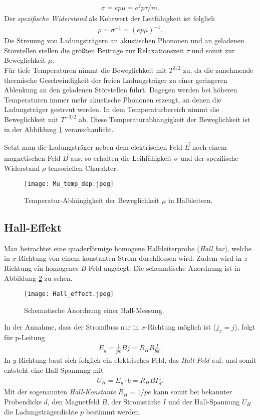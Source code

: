 \begin{align}
\sigma=ep\mu=e^2p\tau/m.
\end{align}
Der \emph{spezifische Widerstand} als Kehrwert der Leitfähigkeit ist folglich
\begin{align}
\rho=\sigma^{-1}=(ep\mu)^{-1}.
\label{eq:p_rho_mu}
\end{align}
Die Streuung von Ladungsträgern an akustischen Phononen und an geladenen Störstellen stellen die größten Beiträge zur Relaxationszeit $\tau$ und somit   zur Beweglichkeit $\mu$.\\
Für tiefe Temperaturen nimmt die Beweglichkeit mit $T^{3/2}$ zu, da die zunehmende thermische Geschwindigkeit der freien Ladungsträger zu einer geringeren Ablenkung an den geladenen Störstellen führt. Dagegen werden bei höheren Temperaturen immer mehr akustische Phononen erzeugt, an denen die Ladungsträger gestreut werden. In dem Temperaturbereich nimmt die Beweglichkeit mit $T^{-3/2}$ ab. Diese Temperaturabhängigkeit der Beweglichkeit ist in der Abbildung \ref{fig:mu-temp_dep} veranschaulicht.

Setzt man die Ladungsträger neben dem elektrischen Feld $\vec{E}$ noch einem magnetischen Feld $\vec{B}$ aus, so erhalten die Leihfähigkeit $\sigma$ und der spezifische Widerstand $\rho$ tensoriellen Charakter.
\enlargethispage{3em}
\begin{figure}[h!]
\centering
\texttt{[image: Mu\_temp\_dep.jpeg]}
\caption{Temperatur-Abhängigkeit der Beweglichkeit $\mu$ in Halbleitern. \cite{lit:GroMa14}}
\label{fig:mu-temp_dep}
\end{figure}

\newpage
\subsection{Hall-Effekt}
Man betrachtet eine quaderförmige homogene Halbleiterprobe (\emph{Hall bar}), welche in $x$-Richtung von einem konstanten Strom durchflossen wird. Zudem wird in $z$-Richtung ein homogenes $B$-Feld angelegt. Die schematische Anordnung ist in Abbildung \ref{fig:hall-effect} zu sehen.
\begin{figure}[h]
\centering
\texttt{[image: Hall\_effect.jpeg]}
\caption{Schematische Anordnung einer Hall-Messung. \cite{lit:Iba09}}
\label{fig:hall-effect}
\end{figure}

In der Annahme, dass der Stromfluss nur in $x$-Richtung möglich ist ($j_x=j$), folgt für p-Leitung
\begin{align}
E_y=\frac{1}{pe}Bj=R_H B\frac{I}{bd}.
\end{align}
In $y$-Richtung baut sich folglich ein elektrisches Feld, das \emph{Hall-Feld} auf, und somit entsteht eine Hall-Spannung mit
\begin{align}
U_H=E_y\cdot b=R_H B I\frac{1}{d}.
\end{align}
Mit der sogenannten \emph{Hall-Konstante} $R_H=1/pe$ kann somit bei bekannter Probendicke $d$, den Magnetfeld $B$, der Stromstärke $I$ und der Hall-Spannung $U_H$ die Ladungsträgerdichte $p$ bestimmt werden.

